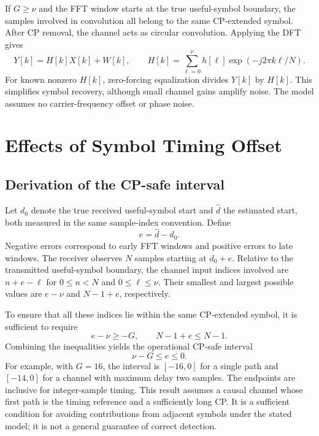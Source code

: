 If $G\geq\nu$ and the FFT window starts at the true useful-symbol boundary, the samples involved in convolution all belong to the same CP-extended symbol. After CP removal, the channel acts as circular convolution. Applying the DFT gives
\begin{equation}
 Y[k]=H[k]X[k]+W[k],\qquad
 H[k]=\sum_{\ell=0}^{\nu}h[\ell]\exp(-j2\pi k\ell/N).
 \label{eq:freq_channel}
\end{equation}
For known nonzero $H[k]$, zero-forcing equalization divides $Y[k]$ by $H[k]$. This simplifies symbol recovery, although small channel gains amplify noise. The model assumes no carrier-frequency offset or phase noise.

\section{Effects of Symbol Timing Offset}
\subsection{Derivation of the CP-safe interval}
Let $d_0$ denote the true received useful-symbol start and $\widehat d$ the estimated start, both measured in the same sample-index convention. Define
\begin{equation}
 e=\widehat d-d_0.
 \label{eq:timing_error}
\end{equation}
Negative errors correspond to early FFT windows and positive errors to late windows. The receiver observes $N$ samples starting at $d_0+e$. Relative to the transmitted useful-symbol boundary, the channel input indices involved are $n+e-\ell$ for $0\leq n<N$ and $0\leq\ell\leq\nu$. Their smallest and largest possible values are $e-\nu$ and $N-1+e$, respectively.

To ensure that all these indices lie within the same CP-extended symbol, it is sufficient to require
\begin{equation}
 e-\nu\geq-G,\qquad N-1+e\leq N-1.
\end{equation}
Combining the inequalities yields the operational CP-safe interval
\begin{equation}
 \boxed{\nu-G\leq e\leq 0.}
 \label{eq:cp_safe}
\end{equation}
For example, with $G=16$, the interval is $[-16,0]$ for a single path and $[-14,0]$ for a channel with maximum delay two samples. The endpoints are inclusive for integer-sample timing. This result assumes a causal channel whose first path is the timing reference and a sufficiently long CP. It is a sufficient condition for avoiding contributions from adjacent symbols under the stated model; it is not a general guarantee of correct detection.

